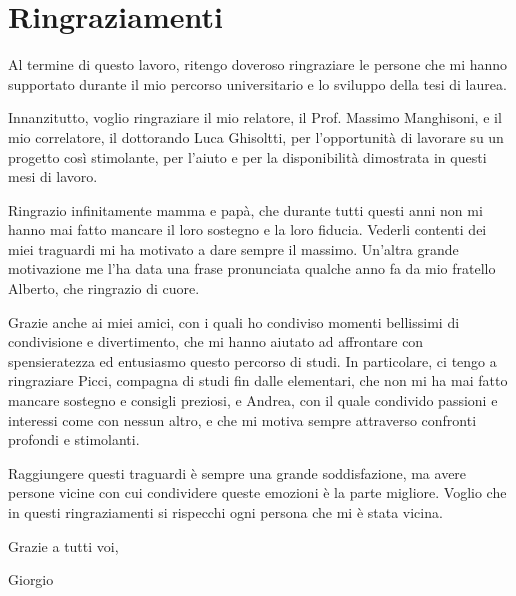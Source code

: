 \newpage
\mbox{}
\chapter*{Ringraziamenti}
Al termine di questo lavoro, ritengo doveroso ringraziare le persone che mi hanno supportato durante il mio percorso universitario e lo 
sviluppo della tesi di laurea.

Innanzitutto, voglio ringraziare il mio relatore, il Prof. Massimo Manghisoni, e il mio correlatore, il dottorando Luca Ghisoltti, per 
l'opportunità di lavorare su un progetto così stimolante, per l'aiuto e per la disponibilità dimostrata in questi mesi di lavoro.

Ringrazio infinitamente mamma e papà, che durante tutti questi anni non mi hanno mai fatto mancare il loro sostegno e la loro fiducia. 
Vederli contenti dei miei traguardi mi ha motivato a dare sempre il massimo. Un'altra grande motivazione me l'ha data una frase pronunciata 
qualche anno fa da mio fratello Alberto, che ringrazio di cuore.

Grazie anche ai miei amici, con i quali ho condiviso momenti bellissimi di condivisione e divertimento, che mi hanno aiutato ad affrontare 
con spensieratezza ed entusiasmo questo percorso di studi. In particolare, ci tengo a ringraziare Picci, compagna di studi fin dalle 
elementari, che non mi ha mai fatto mancare sostegno e consigli preziosi, e Andrea, con il quale condivido passioni e interessi come con 
nessun altro, e che mi motiva sempre attraverso confronti profondi e stimolanti.

Raggiungere questi traguardi è sempre una grande soddisfazione, ma avere persone vicine con cui condividere queste emozioni è la parte 
migliore. Voglio che in questi ringraziamenti si rispecchi ogni persona che mi è stata vicina.

Grazie a tutti voi,  

Giorgio